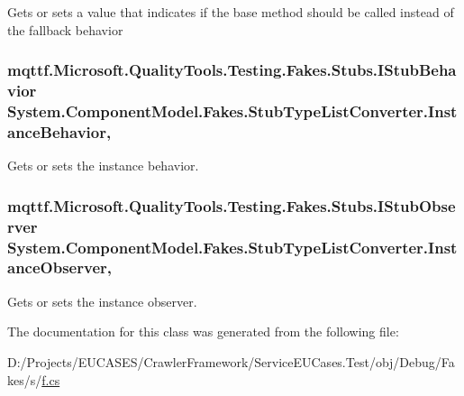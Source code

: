 Gets or sets a value that indicates if the base method should be called instead of the fallback behavior

\hypertarget{class_system_1_1_component_model_1_1_fakes_1_1_stub_type_list_converter_aa45fba924ef89863c2fe16625e5edf2c}{
\subsubsection[{Instance\-Behavior}]{\setlength{\rightskip}{0pt plus 5cm}mqttf.\-Microsoft.\-Quality\-Tools.\-Testing.\-Fakes.\-Stubs.\-I\-Stub\-Behavior System.\-Component\-Model.\-Fakes.\-Stub\-Type\-List\-Converter.\-Instance\-Behavior\hspace{0.3cm}{\ttfamily [get]}, {\ttfamily [set]}}}\label{class_system_1_1_component_model_1_1_fakes_1_1_stub_type_list_converter_aa45fba924ef89863c2fe16625e5edf2c}


Gets or sets the instance behavior.

\hypertarget{class_system_1_1_component_model_1_1_fakes_1_1_stub_type_list_converter_af432d410786ff755508a15cab5f10375}{
\subsubsection[{Instance\-Observer}]{\setlength{\rightskip}{0pt plus 5cm}mqttf.\-Microsoft.\-Quality\-Tools.\-Testing.\-Fakes.\-Stubs.\-I\-Stub\-Observer System.\-Component\-Model.\-Fakes.\-Stub\-Type\-List\-Converter.\-Instance\-Observer\hspace{0.3cm}{\ttfamily [get]}, {\ttfamily [set]}}}\label{class_system_1_1_component_model_1_1_fakes_1_1_stub_type_list_converter_af432d410786ff755508a15cab5f10375}


Gets or sets the instance observer.



The documentation for this class was generated from the following file\-:\begin{DoxyCompactItemize}
\item 
D\-:/\-Projects/\-E\-U\-C\-A\-S\-E\-S/\-Crawler\-Framework/\-Service\-E\-U\-Cases.\-Test/obj/\-Debug/\-Fakes/s/\hyperlink{s_2f_8cs}{f.\-cs}\end{DoxyCompactItemize}
